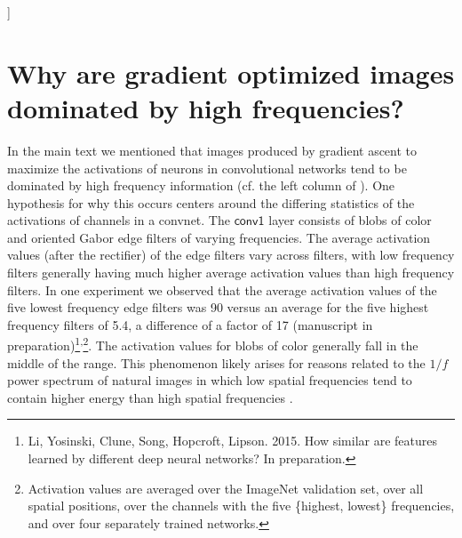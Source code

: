 \documentclass{article}
\newcommand{\layer}[1]{\ensuremath{\mathsf{#1}\xspace}}
\begin{document}
\vskip 0.3in
]




\section{Why are gradient optimized images dominated by high frequencies?}

In the main text we mentioned that images produced by gradient ascent to maximize the activations of neurons in convolutional networks tend to be dominated by high frequency information (cf.  the left column of ). One hypothesis for why this occurs centers around the differing statistics of the activations of channels in a convnet. The \layer{conv1} layer consists of blobs of color and oriented Gabor edge filters of varying frequencies. The average activation values (after the rectifier) of the edge filters vary across filters, with low frequency filters generally having much higher average activation values than high frequency filters. In one experiment we observed that the average activation values of the five lowest frequency edge filters was 90 versus an average for the five highest frequency filters of 5.4, a difference of a factor of 17 (manuscript in preparation)\footnote{Li, Yosinski, Clune, Song, Hopcroft, Lipson. 2015. How similar are features learned by different deep neural networks? In preparation.}\textsuperscript{,}\footnote{Activation values are averaged over the ImageNet validation set, over all spatial positions, over the channels with the five \{highest, lowest\} frequencies, and over four separately trained networks.}. The activation values for blobs of color generally fall in the middle of the range.
This phenomenon likely arises for reasons related to the $1/f$ power spectrum of natural images in which low spatial frequencies tend to contain higher energy than high spatial frequencies \citep{torralba-2003-Network-statistics-of-natural-image}.


\end{document}
